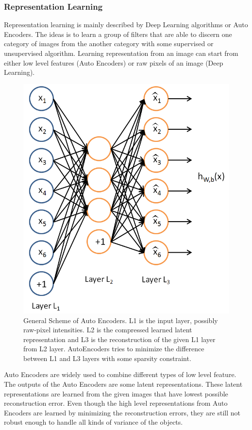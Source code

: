 \subsubsection{Representation Learning}
Representation learning is mainly described by Deep Learning 
algorithms or Auto Encoders. The ideas is to learn a group of filters that are able to discern one category of images from the another category with some supervised or unsupervised algorithm. 
Learning representation from an image can start from either low level features (Auto Encoders) or raw pixels of an image (Deep Learning).
\begin{figure}
	\centering
	\includegraphics[scale=.3]{introduction/fig/sparsecoding.png}
	\caption{General Scheme of Auto Encoders. L1 is the input layer, possibly raw-pixel intensities. L2 is the compressed learned latent representation and L3 is the reconstruction of the given L1 layer from L2 layer. AutoEncoders tries to minimize the difference between L1 and L3 layers with some sparsity constraint.}\label{fig:intro:sparse}
\end{figure}

Auto Encoders are widely used to combine different types of low level feature. The outputs of the Auto Encoders are some latent representations. These latent representations are learned from the given images that have lowest possible reconstruction error. Even though the high level representations from Auto Encoders are learned by minimizing the reconstruction errors, they are still not robust enough to handle all kinds of variance of the objects.

